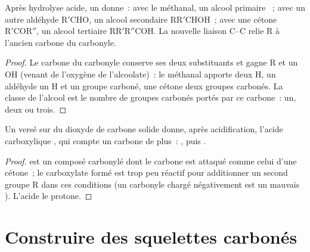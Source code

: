 \begin{proposition}\label{prop:b1:organomagnesium:carbonyl-addition}
Après hydrolyse acide, un   donne~: avec le
méthanal, un alcool primaire ~; avec un autre aldéhyde
$\mathrm{R'CHO}$, un alcool secondaire $\mathrm{RR'CHOH}$~; avec une
cétone $\mathrm{R'COR''}$, un alcool tertiaire
$\mathrm{RR'R''COH}$. La nouvelle liaison C--C relie R à l'ancien carbone
du carbonyle.
\end{proposition}

\begin{proof}
Le carbone du carbonyle conserve ses deux substituants et gagne R et un
OH (venant de l'oxygène de l'alcoolate)~: le méthanal apporte deux H, un
aldéhyde un H et un groupe carboné, une cétone deux groupes carbonés. La
classe de l'alcool est le nombre de groupes carbonés portés par ce
carbone~: un, deux ou trois.
\end{proof}

\begin{proposition}\label{prop:b1:organomagnesium:co2}
Un  versé sur du dioxyde de carbone solide donne,
après acidification, l'acide carboxylique , qui compte un
carbone de plus~:
, puis .
\end{proposition}

\begin{proof}
 est un composé carbonylé dont le carbone est attaqué comme
celui d'une cétone~; le carboxylate formé est trop peu réactif pour
additionner un second groupe R dans ces conditions (un carbonyle chargé
négativement est un mauvais ). L'acide le protone.
\end{proof}

\section{Construire des squelettes carbonés}

